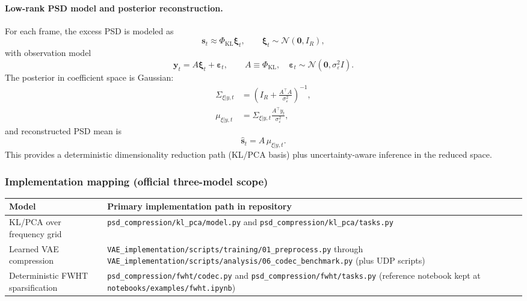 \documentclass[11pt]{article}
\begin{document}
\paragraph{Low-rank PSD model and posterior reconstruction.}
For each frame, the excess PSD is modeled as
\begin{equation}
\mathbf{s}_t \approx \Phi_{\mathrm{KL}} \boldsymbol{\xi}_t,\qquad
\boldsymbol{\xi}_t \sim \mathcal{N}(\mathbf{0},I_R),
\end{equation}
with observation model
\begin{equation}
\mathbf{y}_t = A\boldsymbol{\xi}_t + \boldsymbol{\varepsilon}_t,\qquad
A\equiv \Phi_{\mathrm{KL}},\quad
\boldsymbol{\varepsilon}_t\sim\mathcal{N}(\mathbf{0},\sigma_\varepsilon^2 I).
\end{equation}
The posterior in coefficient space is Gaussian:
\begin{align}
\Sigma_{\xi|y,t} &= \left(I_R + \frac{A^\top A}{\sigma_\varepsilon^2}\right)^{-1},\\
\mu_{\xi|y,t} &= \Sigma_{\xi|y,t}\frac{A^\top y_t}{\sigma_\varepsilon^2},
\end{align}
and reconstructed PSD mean is
\begin{equation}
\hat{\mathbf{s}}_t = A\,\mu_{\xi|y,t}.
\end{equation}
This provides a deterministic dimensionality reduction path (KL/PCA basis) plus uncertainty-aware
inference in the reduced space.

\subsubsection*{Implementation mapping (official three-model scope)}
\begin{center}
\begin{tabular}{|l|p{}|}
\hline
\textbf{Model} & \textbf{Primary implementation path in repository} \\ \hline
KL/PCA over frequency grid &
\texttt{psd\_compression/kl\_pca/model.py} and \texttt{psd\_compression/kl\_pca/tasks.py} \\ \hline
Learned VAE compression &
\texttt{VAE\_implementation/scripts/training/01\_preprocess.py} through
\texttt{VAE\_implementation/scripts/analysis/06\_codec\_benchmark.py} (plus UDP scripts) \\ \hline
Deterministic FWHT sparsification &
\texttt{psd\_compression/fwht/codec.py} and \texttt{psd\_compression/fwht/tasks.py}
(reference notebook kept at \texttt{notebooks/examples/fwht.ipynb}) \\ \hline
\end{tabular}
\end{center}
\end{document}
